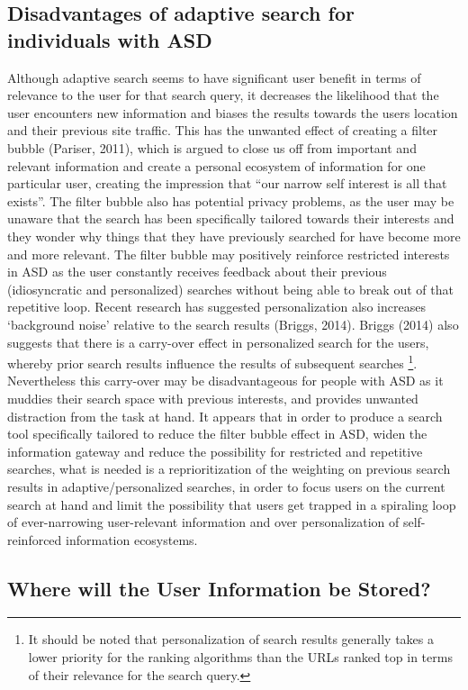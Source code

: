 \documentclass[11pt]{article}
\begin{document}
\subsection{Disadvantages of adaptive search for individuals with ASD}
Although adaptive search seems to have significant user benefit in terms of relevance to the user for that search query, it decreases the likelihood that the user encounters new information and biases the results towards the users location and their previous site traffic.  This has the unwanted effect of creating a filter bubble (Pariser, 2011), which is argued to close us off from important and relevant information and create a personal ecosystem of information for one particular user, creating the impression that “our narrow self interest is all that exists”. The filter bubble also has potential privacy problems, as the user may be unaware that the search has been specifically tailored towards their interests and they wonder why things that they have previously searched for have become more and more relevant. The filter bubble may positively reinforce restricted interests in ASD as the user constantly receives feedback about their previous (idiosyncratic and personalized) searches without being able to break out of that repetitive loop. 
Recent research has suggested personalization also increases ‘background noise’ relative to the search results (Briggs, 2014). Briggs (2014) also suggests that there is a carry-over effect in personalized search for the users, whereby prior search results influence the results of subsequent searches \footnote{It should be noted that personalization of search results generally takes a lower priority for the ranking algorithms than the URLs ranked top in terms of their relevance for the search query.}.  Nevertheless this carry-over may be disadvantageous for people with ASD as it muddies their search space with previous interests, and provides unwanted distraction from the task at hand. 
It appears that in order to produce a search tool specifically tailored to reduce the filter bubble effect in ASD, widen the information gateway and reduce the possibility for restricted and repetitive searches, what is needed is a reprioritization of the weighting on previous search results in adaptive/personalized searches, in order to focus users on the current search at hand and limit the possibility that users get trapped in a spiraling loop of ever-narrowing user-relevant information and over personalization of self-reinforced information ecosystems.

\subsection{Where will the User Information be Stored?}
\end{document}
